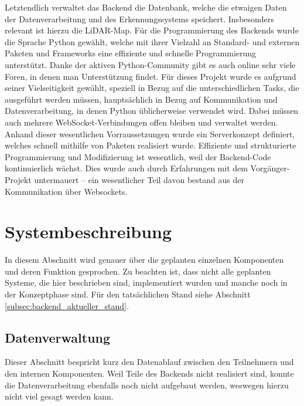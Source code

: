 Letztendlich verwaltet das Backend die Datenbank, 
welche die etwaigen Daten der Datenverarbeitung und des Erkennungssystems speichert.
%
Insbesonders relevant ist hierzu die LiDAR-Map.
%
Für die Programmierung des Backends wurde die Sprache Python gewählt, 
welche mit ihrer Vielzahl an Standard- und externen Paketen 
und Frameworks eine effiziente und schnelle Programmierung unterstützt.
%
Danke der aktiven Python-Community gibt es auch online sehr viele Foren,
in denen man Unterstützung findet.
% 
Für dieses Projekt wurde es aufgrund seiner Vielseitigkeit gewählt, 
speziell in Bezug auf die unterschiedlichen Tasks, 
die ausgeführt werden müssen, 
hauptsächlich in Bezug auf Kommunikation und Datenverarbeitung, 
in denen Python üblicherweise verwendet wird.
% 
Dabei müssen auch mehrere WebSocket-Verbindungen offen bleiben und verwaltet werden. 
Anhand dieser wesentlichen Vorraussetzungen wurde ein Serverkonzept definiert, 
welches schnell mithilfe von Paketen realisiert wurde. 
%
Effiziente und strukturierte Programmierung und Modifizierung ist wesentlich, 
weil der Backend-Code kontinuierlich wächst.
% 
Dies wurde auch durch Erfahrungen mit dem Vorgänger-Projekt untermauert --
ein wesentlicher Teil davon bestand aus der Kommunikation über Websockets.
\section{Systembeschreibung}
In diesem Abschnitt wird genauer 
über die geplanten einzelnen Komponenten 
und deren Funktion gesprochen.
%
Zu beachten ist, dass nicht alle geplanten Systeme, die hier beschrieben sind, 
implementiert wurden und manche noch in der Konzeptphase sind.
Für den tatsächlichen Stand siehe Abschnitt \ref{subsec:backend_aktueller_stand}.
%
\subsection{Datenverwaltung}
\label{subsec:backend_data}

Dieser Abschnitt bespricht kurz den Datenablauf 
zwischen den Teilnehmern und den internen Komponenten.
% 
Weil Teile des Backends nicht realisiert sind,
konnte die Datenverarbeitung ebenfalls noch nicht aufgebaut werden,
weswegen hierzu nicht viel gesagt werden kann.

